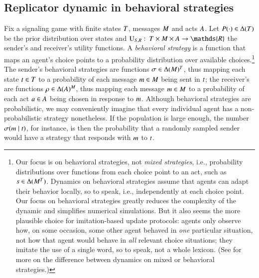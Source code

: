 \documentclass[fleqn,reqno,10pt]{article}
\renewcommand{\Pr}{\ensuremath{P}}
\begin{document}
\subsection{Replicator dynamic in behavioral strategies}
\label{sec:repl-dynam-behav}

Fix a signaling game with finite states $T$, messages $M$ and acts $A$. Let
$\Pr(\cdot) \in \Delta(\States)$ be the prior distribution over states and
$\Util_{\sen,\rec} \mycolon \States \times \Messgs \times \Acts \rightarrow \mathds{R}$ the
sender's and receiver's utility functions. A \emph{behavioral strategy} is a function that maps
an agent's choice points to a probability distribution over available choices.\footnote{Our
  focus is on behavioral strategies, not \emph{mixed strategies}, i.e., probability
  distributions over functions from each choice point to an act, such as
  $s \in \Delta(M^{T})$.  Dynamics on behavioral strategies assume that agents can
  adapt their behavior locally, so to speak, i.e., independently at each choice point. Our
  focus on behavioral strategies greatly reduces the complexity of the dynamic and simplifies
  numerical simulations. But it also seems the more plausible choice for imitation-based update
  protocols: agents only observe how, on some occasion, some other agent behaved in \emph{one}
  particular situation, not how that agent would behave in \emph{all} relevant choice
  situations; they imitate the use of a single word, so to speak, not a whole lexicon. (See
  \citet{Cressman2003:Evolutionary-Dy} for more on the difference between dynamics on mixed or
  behavioral strategies.)} The sender's behavioral strategies are functions
$\sigma \in \Delta(M)^T$, thus mapping each state $t \in T$ to a
probability of each message $m \in M$ being sent in $t$; the receiver's are
functions $\rho \in \Delta(A)^M$, thus mapping each message $m \in M$
to a probability of each act $a \in A$ being chosen in response to $m$. Although
behavioral strategies are probabilistic, we may conveniently imagine that every individual
agent has a non-probabilistic strategy nonetheless. If the population is large enough, the
number $\sigma(m \mid t)$, for instance, is then the probability that a randomly
sampled sender would have a strategy that responds with $m$ to $t$.
\end{document}
